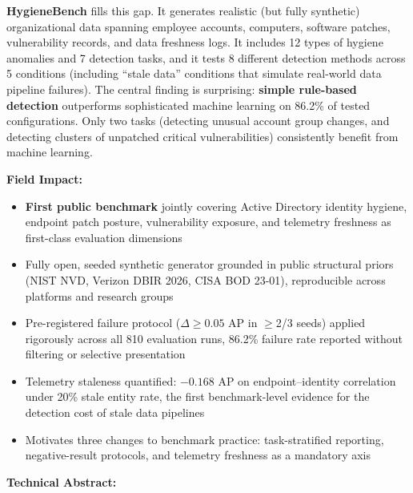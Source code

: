 \documentclass[12pt,letterpaper]{article}
\begin{document}
\textbf{HygieneBench} fills this gap. It generates realistic (but fully
synthetic) organizational data spanning employee accounts, computers, software
patches, vulnerability records, and data freshness logs. It includes 12 types
of hygiene anomalies and 7 detection tasks, and it tests 8 different detection
methods across 5 conditions (including ``stale data'' conditions that simulate
real-world data pipeline failures). The central finding is surprising:
\textbf{simple rule-based detection} outperforms sophisticated machine learning
on 86.2\% of tested configurations. Only two tasks (detecting unusual account
group changes, and detecting clusters of unpatched critical vulnerabilities)
consistently benefit from machine learning.

\vspace{0.5em}
\noindent\textbf{Field Impact:}
\begin{itemize}[leftmargin=*,itemsep=2pt]
  \item \textbf{First public benchmark} jointly covering Active Directory identity
        hygiene, endpoint patch posture, vulnerability exposure, and telemetry
        freshness as first-class evaluation dimensions
  \item Fully open, seeded synthetic generator grounded in public structural priors
        (NIST NVD, Verizon DBIR 2026, CISA BOD 23-01), 
        reproducible across platforms and research groups
  \item Pre-registered failure protocol ($\Delta \geq 0.05$ AP in $\geq$2/3 seeds) applied
        rigorously across all 810 evaluation runs, 86.2\% failure rate reported
        without filtering or selective presentation
  \item Telemetry staleness quantified: $-0.168$ AP on endpoint--identity correlation
        under 20\% stale entity rate, the first benchmark-level evidence for
        the detection cost of stale data pipelines
  \item Motivates three changes to benchmark practice: task-stratified reporting,
        negative-result protocols, and telemetry freshness as a mandatory axis
\end{itemize}

\vspace{0.5em}
\noindent\textbf{Technical Abstract:}
\end{document}
